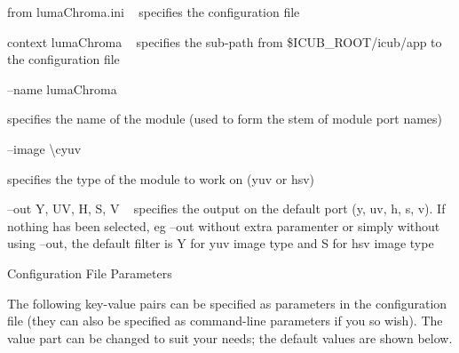 \begin{DoxyItemize}
\item {\ttfamily from} {\ttfamily luma\+Chroma.\+ini} ~\newline
 specifies the configuration file
\item {\ttfamily context} {\ttfamily luma\+Chroma} ~\newline
 specifies the sub-\/path from {\ttfamily \$\+I\+C\+U\+B\+\_\+\+R\+O\+OT/icub/app} to the configuration file
\item {\ttfamily --name} {\ttfamily luma\+Chroma} ~\newline


specifies the name of the module (used to form the stem of module port names)
\item {\ttfamily --image} \textbackslash{}cyuv ~\newline


specifies the type of the module to work on (yuv or hsv)
\item {\ttfamily --out} {\ttfamily Y}, UV, H, S, V ~\newline
 specifies the output on the default port (y, uv, h, s, v). If nothing has been selected, eg --out without extra paramenter or simply without using --out, the default filter is Y for yuv image type and S for hsv image type
\end{DoxyItemize}

Configuration File Parameters

The following key-\/value pairs can be specified as parameters in the configuration file (they can also be specified as command-\/line parameters if you so wish). The value part can be changed to suit your needs; the default values are shown below.



